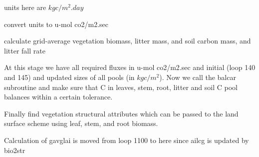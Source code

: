units here are $kg c/m^2 .day$

convert units to u-\/mol co2/m2.\+sec

calculate grid-\/average vegetation biomass, litter mass, and soil carbon mass, and litter fall rate

At this stage we have all required fluxes in u-\/mol co2/m2.\+sec and initial (loop 140 and 145) and updated sizes of all pools (in $kg c/m^2$). Now we call the balcar subroutine and make sure that C in leaves, stem, root, litter and soil C pool balances within a certain tolerance.

Finally find vegetation structural attributes which can be passed to the land surface scheme using leaf, stem, and root biomass.

Calculation of gavglai is moved from loop 1100 to here since ailcg is updated by bio2str